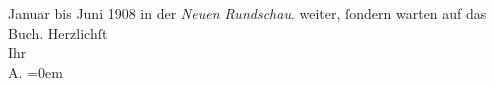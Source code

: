 \begin{ledgroupsized}[t]{13cm}
{{{                     Januar bis Juni 1908 in der \emph{Neuen Rundschau}.}}}\label{K_L01761_2h} weiter, ſondern warten auf das
               Buch.\pend
           \pstart
           Herzlichſt{\\[\baselineskip]}Ihr{\\[\baselineskip]}\spacefill\mbox{A.}\pend
           \leftskip=0em{}
         
         \endnumbering{}\end{ledgroupsized}  \newcommand{\dateiname}{L01761}\newcommand{\titel}{Arthur Schnitzler an Richard Beer-Hofmann, 18. 2. 1908}\newcommand{\editorInnen}{Martin Anton Müller und Gerd-Hermann Susen}
      